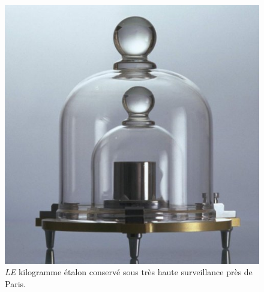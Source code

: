 \begin{enumerate}
\begin{figure}[b]
\center
\includegraphics[scale=0.19]{images/kilogramme_etalon.jpg}
\caption{\emph{LE} kilogramme étalon conservé sous très haute surveillance près de Paris.}
\end{figure}


\end{enumerate}


